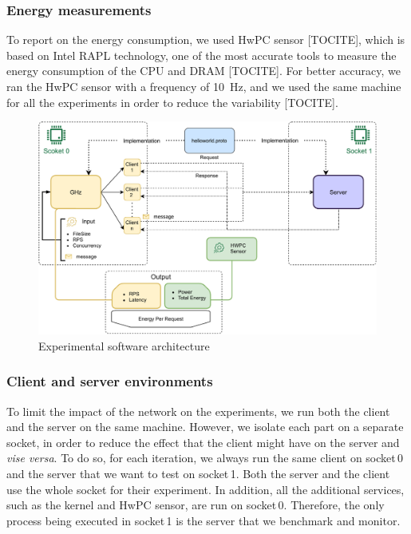 \subsubsection{Energy measurements}
To report on the energy consumption, we used HwPC sensor [TOCITE], which is based on Intel RAPL technology, one of the most accurate tools to measure the energy consumption of the CPU and DRAM [TOCITE].
For better accuracy, we ran the HwPC sensor with a frequency of 10~Hz, and we used the same machine for all the experiments in order to reduce the variability [TOCITE].

\begin{figure}[!hbt]
    \begin{center}
        \includegraphics[width=.8\linewidth]{imgs/rpcprotocol}
    \end{center}
    \caption{Experimental software architecture}\label{fig:rpcprotocol}
\end{figure}

\subsubsection{Client and server environments}
To limit the impact of the network on the experiments, we run both the client and the server on the same machine.
However, we isolate each part on a separate socket, in order to reduce the effect that the client might have on the server and \emph{vise versa}.
To do so, for each iteration, we always run the same client on \textsf{socket\,0} and the server that we want to test on \textsf{socket\,1}.
Both the server and the client use the whole socket for their experiment.
In addition, all the additional services, such as the kernel and HwPC sensor, are run on \textsf{socket\,0}.
Therefore, the only process being executed in \textsf{socket\,1} is the server that we benchmark and monitor.

